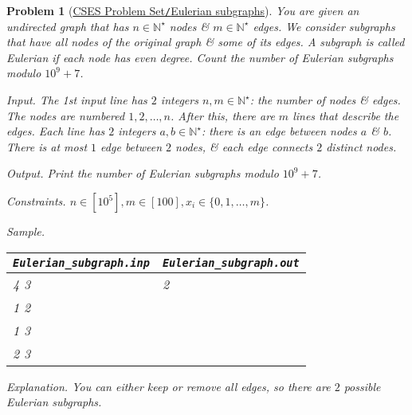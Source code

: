 \documentclass{article}
\newtheorem{problem}{Problem}
\begin{document}
\begin{problem}[\href{https://cses.fi/problemset/task/2078}{CSES Problem Set{\tt/}Eulerian subgraphs}]
    You are given an undirected graph that has $n\in\mathbb{N}^\star$ nodes \& $m\in\mathbb{N}^\star$ edges. We consider subgraphs that have all nodes of the original graph \& some of its edges. A subgraph is called {\it Eulerian} if each node has even degree. Count the number of Eulerian subgraphs modulo $10^9 + 7$.
    \item {\sf Input.} The 1st input line has $2$ integers $n,m\in\mathbb{N}^\star$: the number of nodes \& edges. The nodes are numbered $1,2,\ldots,n$. After this, there are $m$ lines that describe the edges. Each line has $2$ integers $a,b\in\mathbb{N}^\star$: there is an edge between nodes $a$ \& $b$. There is at most $1$ edge between $2$ nodes, \& each edge connects $2$ distinct nodes.
    \item {\sf Output.} Print the  number of Eulerian subgraphs modulo $10^9 + 7$.
    \item {\sf Constraints.} $n\in[10^5],m\in[100],x_i\in\{0,1,\ldots,m\}$.
    \item {\sf Sample.}
    \begin{table}[H]
        \centering
        \begin{tabular}{|l|l|}
            \hline
            \verb|Eulerian_subgraph.inp| & \verb|Eulerian_subgraph.out| \\
            \hline
            4 3 & 2 \\
            1 2 & \\
            1 3 & \\
            2 3 & \\
            \hline
        \end{tabular}
    \end{table}
    \item {\sf Explanation.} You can either keep or remove all edges, so there are $2$ possible Eulerian subgraphs.
\end{problem}
\end{document}
